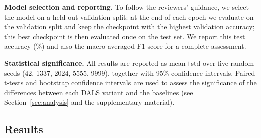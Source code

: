 \documentclass[a4paper,fleqn]{cas-dc}
\begin{document}
\textbf{Model selection and reporting.} To follow the reviewers' guidance, we select the model on a held-out validation split: at the end of each epoch we evaluate on the validation split and keep the checkpoint with the highest validation accuracy; this best checkpoint is then evaluated once on the test set. We report this test accuracy (\%) and also the macro-averaged F1 score for a complete assessment.

\textbf{Statistical significance.} All results are reported as mean$\pm$std over five random seeds (42, 1337, 2024, 5555, 9999), together with 95\% confidence intervals. Paired t-tests and bootstrap confidence intervals are used to assess the significance of the differences between each DALS variant and the baselines (see Section~\mbox{\ref{sec:analysis}} and the supplementary material).

\subsection{Results}
\end{document}
